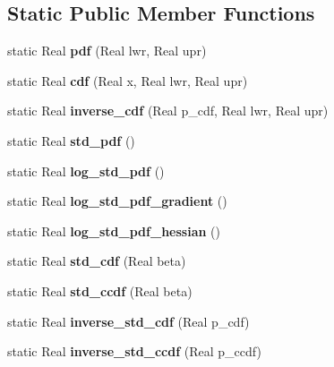 \subsection*{Static Public Member Functions}
\begin{DoxyCompactItemize}
\item 
static Real {\bfseries pdf} (Real lwr, Real upr)\label{classPecos_1_1UniformRandomVariable_a09056f23fc78cfe6b94837c373219fcd}

\item 
static Real {\bfseries cdf} (Real x, Real lwr, Real upr)\label{classPecos_1_1UniformRandomVariable_aede5e67889821db4de4440970772d0a0}

\item 
static Real {\bfseries inverse\+\_\+cdf} (Real p\+\_\+cdf, Real lwr, Real upr)\label{classPecos_1_1UniformRandomVariable_ad10cd842bebac0a1bd97410135ee86ef}

\item 
static Real {\bfseries std\+\_\+pdf} ()\label{classPecos_1_1UniformRandomVariable_ae55201dfdfa3f6040a1964e761cbb3a1}

\item 
static Real {\bfseries log\+\_\+std\+\_\+pdf} ()\label{classPecos_1_1UniformRandomVariable_a789a2d6f83e8dd31b7a99f6aa7e35fc0}

\item 
static Real {\bfseries log\+\_\+std\+\_\+pdf\+\_\+gradient} ()\label{classPecos_1_1UniformRandomVariable_a7618ae9c081763dbdd0cfcacde4c546f}

\item 
static Real {\bfseries log\+\_\+std\+\_\+pdf\+\_\+hessian} ()\label{classPecos_1_1UniformRandomVariable_ae4d8f47aa3f234d3887059246d213335}

\item 
static Real {\bfseries std\+\_\+cdf} (Real beta)\label{classPecos_1_1UniformRandomVariable_adfd8a5e0f47c846afe27b608e8dfbf5a}

\item 
static Real {\bfseries std\+\_\+ccdf} (Real beta)\label{classPecos_1_1UniformRandomVariable_a3ce4e0c5c43b1f67c50c91e1c71e1920}

\item 
static Real {\bfseries inverse\+\_\+std\+\_\+cdf} (Real p\+\_\+cdf)\label{classPecos_1_1UniformRandomVariable_ad0d24d0f74c6ff422ffb64f8204e5c04}

\item 
static Real {\bfseries inverse\+\_\+std\+\_\+ccdf} (Real p\+\_\+ccdf)\label{classPecos_1_1UniformRandomVariable_ab1e233a604518e682cf7d179d3d2879a}


\end{DoxyCompactItemize}

